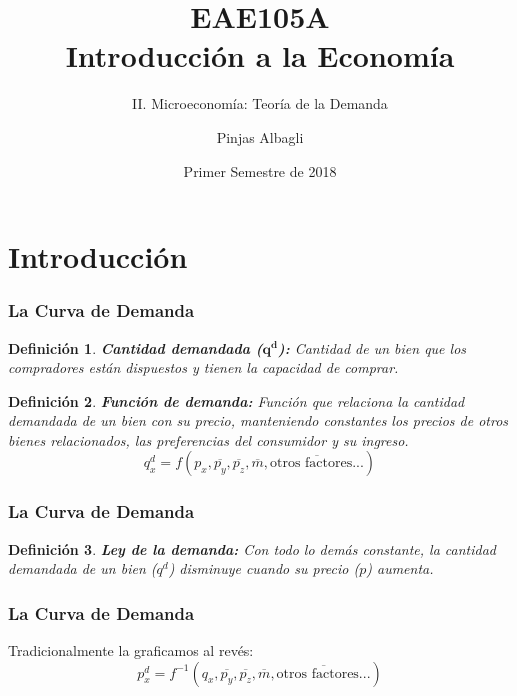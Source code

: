 \documentclass{beamer}
\title{EAE105A \\ Introducción a la Economía}
\subtitle{II. Microeconomía: Teoría de la Demanda}
\author{Pinjas Albagli}
\institute{Instituto de Economía \\ Pontificia Universidad Católica de Chile}
\date{Primer Semestre de 2018}
\newtheorem{mydef}{Definición}
\newcommand{\peq}[1]{{\scriptscriptstyle{#1}}}
\begin{document}
	\maketitle 
	
	\section{Introducción}

		\begin{frame}
			\frametitle{La Curva de Demanda}
			\begin{mydef}
				\textbf{Cantidad demandada ($\mathbf{q^\peq{d}}$):} Cantidad de un bien que los compradores están dispuestos y tienen la capacidad de comprar.
			\end{mydef}
			\begin{mydef}
				\textbf{Función de demanda:} Función que relaciona la cantidad demandada de un bien con su precio, manteniendo constantes los precios de otros bienes relacionados, las preferencias del consumidor y su ingreso. $$q^\peq{d}_\peq{x}=f\left(p_\peq{x},\overline{p_\peq{y}},\overline{p_\peq{z}},\overline{m},\overline{\text{otros factores...}}\right)$$
			\end{mydef}
		\end{frame}
		
		\begin{frame}
			\frametitle{La Curva de Demanda}
			\begin{mydef}
				\textbf{Ley de la demanda:} Con todo lo demás constante, la cantidad demandada de un bien ($q^\peq{d}$) disminuye cuando su precio ($p$) aumenta.
			\end{mydef}
		\end{frame}
		
		\begin{frame}
			\frametitle{La Curva de Demanda}
			Tradicionalmente la graficamos al revés: $$p^\peq{d}_\peq{x}=f^\peq{-1}\left(q_\peq{x},\overline{p_\peq{y}},\overline{p_\peq{z}},\overline{m},\overline{\text{otros factores...}}\right)$$
			\begin{figure}[htbp!]
				\centering
			\end{figure}
		\end{frame}
		
\end{document}
